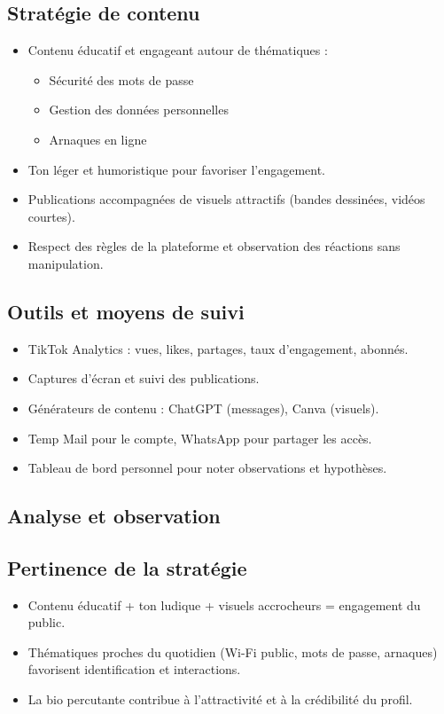\documentclass[12pt]{article}
\begin{document}
\begin{center}
\subsection*{ Stratégie de contenu}
\begin{itemize}[leftmargin=*, label=\textbullet]
    \item Contenu éducatif et engageant autour de thématiques :  
    \begin{itemize}[leftmargin=*, label=--]
        \item Sécurité des mots de passe  
        \item Gestion des données personnelles  
        \item Arnaques en ligne
    \end{itemize}
    \item Ton léger et humoristique pour favoriser l’engagement.  
    \item Publications accompagnées de visuels attractifs (bandes dessinées, vidéos courtes).  
    \item Respect des règles de la plateforme et observation des réactions sans manipulation.
\end{itemize}

\subsection{Outils et moyens de suivi}
\begin{itemize}[leftmargin=*, label=\textbullet]
    \item TikTok Analytics : vues, likes, partages, taux d’engagement, abonnés.  
    \item Captures d’écran et suivi des publications.  
    \item Générateurs de contenu : ChatGPT (messages), Canva (visuels).  
    \item Temp Mail pour le compte, WhatsApp pour partager les accès.  
    \item Tableau de bord personnel pour noter observations et hypothèses.
\end{itemize}

\subsection*{ Analyse et observation}

\subsection{ Pertinence de la stratégie}
\begin{itemize}[leftmargin=*, label=\textbullet]
    \item Contenu éducatif + ton ludique + visuels accrocheurs = engagement du public.  
    \item Thématiques proches du quotidien (Wi-Fi public, mots de passe, arnaques) favorisent identification et interactions.  
    \item La bio percutante contribue à l’attractivité et à la crédibilité du profil.
\end{itemize}


\end{center}
\end{document}
